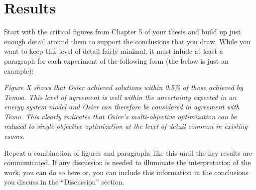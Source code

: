 \section{Results}
Start with the critical figures from Chapter 5 of your thesis and build up just 
enough detail around them to support the conclusions that you draw. While you 
want to keep this level of detail fairly minimal, it must inlude at least a 
paragraph for each experiment of the following form (the below is just an 
example):

\emph{Figure X shows that Osier achieved solutions  within 0.5\%  of those achieved 
by Temoa. This level of agreement is well within the uncertainty expected in an 
energy system model and Osier can therefore be considered in agreement with 
Temo. This clearly indicates that Osier's multi-objective 
optimization can be reduced to single-objective optimization at the level of 
detail common in existing \glspl{esom}. }

Repeat a combination of figures and paragraphs like this until the key results 
are communicated. If any discussion is needed to illuminate the interpretation 
of the work, you can do so here or, you can include this information in the 
conclusions you discuss in the ``Discussion'' section. 
